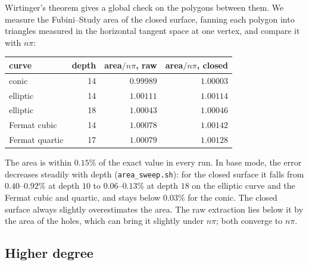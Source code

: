 \documentclass[11pt]{article}
\theoremstyle{plain}
\theoremstyle{definition}
\theoremstyle{remark}
\begin{document}
Wirtinger's theorem gives a global check on the polygons between them.
We measure the Fubini--Study area of the closed surface, fanning each
polygon into triangles measured in the horizontal tangent space at one
vertex, and compare it with $n\pi$:
\begin{center}
\small
\begin{tabular}{@{}lrrr@{}}
\toprule
curve & depth & area$/n\pi$, raw & area$/n\pi$, closed \\
\midrule
conic & 14 & $0.99989$ & $1.00003$ \\
elliptic & 14 & $1.00111$ & $1.00114$ \\
elliptic & 18 & $1.00043$ & $1.00046$ \\
Fermat cubic & 14 & $1.00078$ & $1.00142$ \\
Fermat quartic & 17 & $1.00079$ & $1.00128$ \\
\bottomrule
\end{tabular}
\end{center}
The area is within $0.15\%$ of the exact value in every run. In base
mode, the error decreases steadily with depth
(\texttt{area\_sweep.sh}): for the closed surface it falls from
$0.40$--$0.92\%$ at depth $10$ to $0.06$--$0.13\%$ at depth $18$ on the
elliptic curve and the Fermat cubic and quartic, and stays below $0.03\%$
for the conic. The closed surface always slightly overestimates the area. The raw
extraction lies below it by the area of the holes, which can bring it
slightly under $n\pi$; both converge to $n\pi$.

\subsection{Higher degree}
\label{sec:exp-degree}
\end{document}
